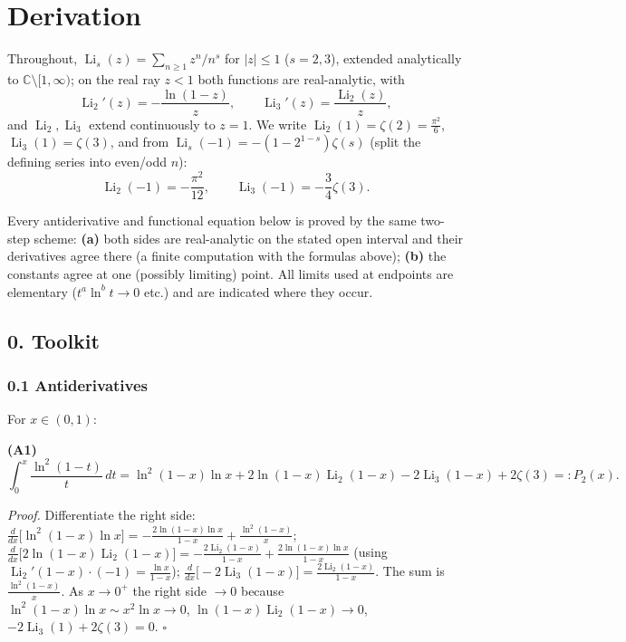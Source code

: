 \documentclass[11pt]{article}
\theoremstyle{remark}
\begin{document}
\section*{Derivation}

Throughout, $\operatorname{Li}_s(z)=\sum_{n\ge1}z^n/n^s$ for $|z|\le 1$ ($s=2,3$), extended analytically to $\mathbb C\setminus[1,\infty)$; on the real ray $z<1$ both functions are real-analytic, with
\[
\operatorname{Li}_2'(z)=-\frac{\ln(1-z)}{z},\qquad \operatorname{Li}_3'(z)=\frac{\operatorname{Li}_2(z)}{z},
\]
and $\operatorname{Li}_2,\operatorname{Li}_3$ extend continuously to $z=1$. We write $\operatorname{Li}_2(1)=\zeta(2)=\frac{\pi^2}{6}$, $\operatorname{Li}_3(1)=\zeta(3)$, and from $\operatorname{Li}_s(-1)=-(1-2^{1-s})\zeta(s)$ (split the defining series into even/odd $n$):
\begin{equation*}
\operatorname{Li}_2(-1)=-\frac{\pi^{2}}{12},\qquad \operatorname{Li}_3(-1)=-\frac34\zeta(3). \tag{V}
\end{equation*}

Every antiderivative and functional equation below is proved by the same two-step scheme: \textbf{(a)} both sides are real-analytic on the stated open interval and their derivatives agree there (a finite computation with the formulas above); \textbf{(b)} the constants agree at one (possibly limiting) point. All limits used at endpoints are elementary ($t^a\ln^bt\to0$ etc.) and are indicated where they occur.

\subsection*{0. Toolkit}

\subsubsection*{0.1 Antiderivatives}

For $x\in(0,1)$:

\textbf{(A1)}
\[
\int_0^x\frac{\ln^2(1-t)}{t}\,dt=\ln^2(1-x)\ln x+2\ln(1-x)\operatorname{Li}_2(1-x)-2\operatorname{Li}_3(1-x)+2\zeta(3)=:P_2(x).
\]

\textit{Proof.} Differentiate the right side: $\frac{d}{dx}\big[\ln^2(1-x)\ln x\big]=-\frac{2\ln(1-x)\ln x}{1-x}+\frac{\ln^2(1-x)}{x}$; $\frac{d}{dx}\big[2\ln(1-x)\operatorname{Li}_2(1-x)\big]=-\frac{2\operatorname{Li}_2(1-x)}{1-x}+\frac{2\ln(1-x)\ln x}{1-x}$ (using $\operatorname{Li}_2'(1-x)\cdot(-1)=\frac{\ln x}{1-x}$); $\frac{d}{dx}\big[-2\operatorname{Li}_3(1-x)\big]=\frac{2\operatorname{Li}_2(1-x)}{1-x}$. The sum is $\frac{\ln^2(1-x)}{x}$. As $x\to0^+$ the right side $\to0$ because $\ln^2(1-x)\ln x\sim x^2\ln x\to0$, $\ln(1-x)\operatorname{Li}_2(1-x)\to0$, $-2\operatorname{Li}_3(1)+2\zeta(3)=0$. $\square$
\end{document}
